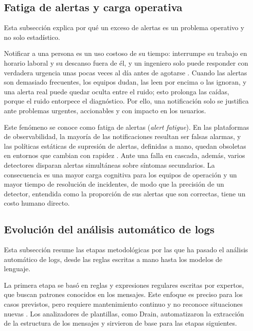\subsection{Fatiga de alertas y carga operativa}\label{sec:ant_fatiga}

Esta subsección explica por qué un exceso de alertas es un problema operativo y no solo estadístico.

Notificar a una persona es un uso costoso de su tiempo: interrumpe su trabajo en horario laboral y su descanso fuera de él, y un ingeniero solo puede responder con verdadera urgencia unas pocas veces al día antes de agotarse \cite{ewaschuk2016_sre_monitoring}. Cuando las alertas son demasiado frecuentes, los equipos dudan, las leen por encima o las ignoran, y una alerta real puede quedar oculta entre el ruido; esto prolonga las caídas, porque el ruido entorpece el diagnóstico. Por ello, una notificación solo se justifica ante problemas urgentes, accionables y con impacto en los usuarios.

Este fenómeno se conoce como fatiga de alertas (\textit{alert fatigue}). En las plataformas de observabilidad, la mayoría de las notificaciones resultan ser falsas alarmas, y las políticas estáticas de supresión de alertas, definidas a mano, quedan obsoletas en entornos que cambian con rapidez \cite{bhukar2024_alertsuppression}. Ante una falla en cascada, además, varios detectores disparan alertas simultáneas sobre síntomas secundarios. La consecuencia es una mayor carga cognitiva para los equipos de operación y un mayor tiempo de resolución de incidentes, de modo que la precisión de un detector, entendida como la proporción de sus alertas que son correctas, tiene un costo humano directo.

\subsection{Evolución del análisis automático de logs}\label{sec:ant_evolucion_logs}

Esta subsección resume las etapas metodológicas por las que ha pasado el análisis automático de logs, desde las reglas escritas a mano hasta los modelos de lenguaje.

La primera etapa se basó en reglas y expresiones regulares escritas por expertos, que buscan patrones conocidos en los mensajes. Este enfoque es preciso para los casos previstos, pero requiere mantenimiento continuo y no reconoce situaciones nuevas \cite{he2021_survey}. Los analizadores de plantillas, como Drain, automatizaron la extracción de la estructura de los mensajes y sirvieron de base para las etapas siguientes.


